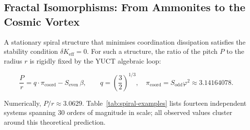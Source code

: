 \documentclass[12pt]{article}
\begin{document}
	\subsection{Fractal Isomorphisms: From Ammonites to the Cosmic Vortex}
	
	A stationary spiral structure that minimises coordination dissipation satisfies the stability condition \(\delta K_{\mathrm{eff}} = 0\). For such a structure, the ratio of the pitch \(P\) to the radius \(r\) is rigidly fixed by the YUCT algebraic loop:
	
	\begin{equation}
		\boxed{ \frac{P}{r} = q \cdot \pi_{\mathrm{coord}} - S_{\mathrm{even}} \, \beta }, \qquad
		q = \left(\frac{3}{2}\right)^{1/3},\quad
		\pi_{\mathrm{coord}} = S_{\mathrm{odd}} \varphi^2 \approx 3.14164078.
		\label{eq:spiral-universal}
	\end{equation}
	
	Numerically, \(P/r \approx 3.0629\). Table~\ref{tab:spiral-examples} lists fourteen independent systems spanning 30 orders of magnitude in scale; all observed values cluster around this theoretical prediction.
	
\end{document}
